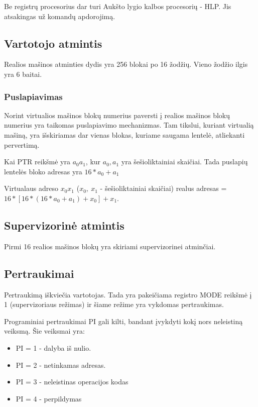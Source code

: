 \documentclass{VUMIFInfKursinis}
\begin{document}
Be registrų procesorius dar turi Aukšto lygio kalbos procesorių - HLP. Jis atsakingas už komandų apdorojimą.

\subsection{Vartotojo atmintis}

Realios mašinos atminties dydis yra 256 blokai po 16 žodžių. Vieno žodžio ilgis yra 6 baitai.

\subsubsection{Puslapiavimas}

Norint virtualios mašinos blokų numerius paversti į realios mašinos blokų numerius yra taikomas puslapiavimo mechanizmas. Tam tikslui, kuriant virtualią mašiną, yra išskiriamas dar vienas blokas, kuriame saugama lentelė, atliekanti pervertimą.

Kai PTR reikšmė yra $a_0a_1$, kur $a_0, a_1$ yra šešioliktainiai skaičiai. Tada puslapių lentelės bloko adresas yra $16 * a_0 + a_1$  

Virtualaus adreso $x_0x_1$ ($x_0, \ x_1$ - šešioliktainiai skaičiai) realus adresas = $16 * [16*(16 * a_0 + a_1) + x_0] + x_1$.

\subsection{Supervizorinė atmintis}

Pirmi 16 realios mašinos blokų yra skiriami supervizorinei atminčiai.

\subsection{Pertraukimai}

Pertraukimą iškviečia vartotojas. Tada yra pakeičiama registro MODE reikšmė į 1 (supervizoriaus režimas) ir šiame režime yra vykdomas pertraukimas. 

Programiniai pertraukimai PI gali kilti, bandant įvykdyti kokį nors neleistiną veiksmą. Šie veiksmai yra:

\begin{itemize}
	\item PI = 1 - dalyba iš nulio.
	\item PI = 2 - netinkamas adresas.
	\item PI = 3 - neleistinas operacijos kodas
	\item PI = 4 - perpildymas
\end{itemize}
\end{document}
